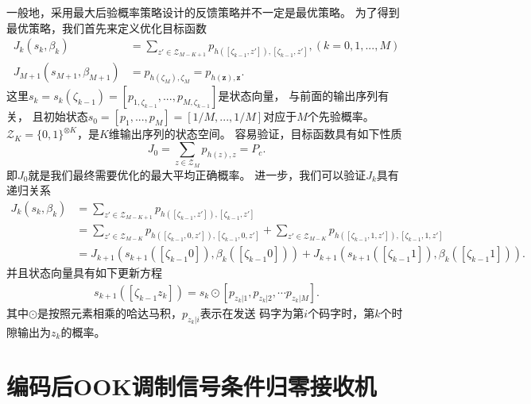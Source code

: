 一般地，采用最大后验概率策略设计的反馈策略并不一定是最优策略。
为了得到最优策略，我们首先来定义优化目标函数\cite{dalla2014adaptive}
\begin{equation}
\begin{split}
J_k(s_k, \beta_k) & = \sum_{z' \in \mathcal{Z}_{M-K+1}} p_{h([\zeta_{k-1}, z']), [\zeta_{k-1}, z']}, (k=0,1,...,M) \\
J_{M+1}(s_{M+1}, \beta_{M+1}) & =  p_{h(\zeta_M), \zeta_M} = p_{h(\bm{z}), \bm{z}}.
\end{split}
\end{equation}
这里$s_k =s_k(\zeta_{k-1}) = [p_{1,\zeta_{k-1}},...,p_{M,\zeta_{k-1}} ]$是状态向量，
与前面的输出序列有关，
且初始状态$s_0 = [p_1,  ..., p_M] = [1/M, ..., 1/M]$对应于$M$个先验概率。
$\mathcal{Z}_{K} = \{0, 1\}^{\otimes K}$，是$K$维输出序列的状态空间。
容易验证，目标函数具有如下性质
\begin{equation}
J_0 = \sum_{z\in \mathcal{Z}_M} p_{h(z),z} = P_c.
\end{equation}
即$J_0$就是我们最终需要优化的最大平均正确概率。
进一步，我们可以验证$J_k$具有递归关系
\begin{equation}
\begin{split}
J_k(s_k, \beta_k) & = \sum_{z' \in \mathcal{Z}_{M-K+1}} p_{h([\zeta_{k-1}, z']), [\zeta_{k-1}, z']} \\
                  & = \sum_{z' \in \mathcal{Z}_{M-K}} p_{h([\zeta_{k-1}, 0 , z']), [\zeta_{k-1}, 0 , z']} + \sum_{z' \in \mathcal{Z}_{M-K}} p_{h([\zeta_{k-1}, 1 , z']), [\zeta_{k-1}, 1 , z']} \\
                  & = J_{k+1}(s_{k+1}([\zeta_{k-1} 0]), \beta_k([\zeta_{k-1} 0])) + J_{k+1}(s_{k+1}([\zeta_{k-1} 1]), \beta_k([\zeta_{k-1} 1])).
\end{split}
\end{equation}
并且状态向量具有如下更新方程
\begin{equation}
\begin{split}
s_{k+1}([\zeta_{k-1} z_k]) = s_k \odot [p_{z_k|1}, p_{z_k|2}, \cdots p_{z_k|M}].
\end{split}
\end{equation}
其中$\odot$是按照元素相乘的哈达马积，$p_{z_k|i}$表示在发送
码字为第$i$个码字时，第$k$个时隙输出为$z_k$的概率。





\section{编码后OOK调制信号条件归零接收机}
